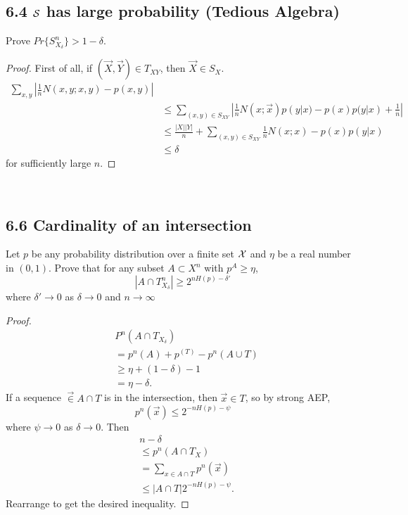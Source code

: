 \documentclass[../main.tex]{subfiles}
\begin{document}
\subsection*{6.4 $\S$ has large probability (Tedious Algebra)}
Prove $Pr\{S^n_{X_\delta}\}>1-\delta$.
\begin{proof}
First of all, if $(\vec X, \vec Y)\in T_{XY}$, then $\vec X\in S_{X}$.
\begin{align*}
     \sum_{x, y} |\frac{1}{n} N(x, y; x, y) - p(x, y) |\\
     &\leq \sum_{(x,y) \in S_{XY}}| \frac{1}{n} N(x; \vec x)p(y|x) - p(x)p(y|x) + \frac{1}{n} |\\
     &\leq \frac{|X||Y|}{n} + \sum_{(x,y) \in S_{XY}} \frac{1}{n} N(x; x) - p(x)p(y|x) \\
     &\leq \delta
\end{align*} for sufficiently large $n$.
   

\end{proof}

\
\subsection*{6.6 Cardinality of an intersection}
Let $p$ be any probability distribution over a finite set $\X$ and $\eta$ be a real number in $(0,1)$. Prove that for any subset $A\subset X^n$ with $p^{A}\geq \eta$, \[
|A\cap T^n_{X_\delta}|\geq 2^{nH(p)-\delta'} 
\] where $\delta'\to 0$ as $\delta\to 0$ and $n\to \infty$
\begin{proof}
    \begin{align*}
        &P^n(A\cap T_{X_\delta})\\
        &= p^n(A)+p^(T)-p^n(A\cup T)\\
        &\geq \eta + (1-\delta) - 1\\
        &=\eta -\delta.
    \end{align*} If a sequence $\vec \in A\cap T$ is in the intersection, then $\vec x\in T$, so by strong AEP, \[
    p^n(\vec x)\leq 2^{-nH(p)-\psi}
    \] where $\psi \to 0$ as $\delta\to 0$. Then \begin{align*}
        &n-\delta\\
        &\leq p^n(A\cap T_X)\\
        &=\sum_{x\in A\cap T} p^n(\vec x)\\
        &\leq |A\cap T|2^{-nH(p)-\psi}.       
    \end{align*} Rearrange to get the desired inequality.
\end{proof}
\end{document}
